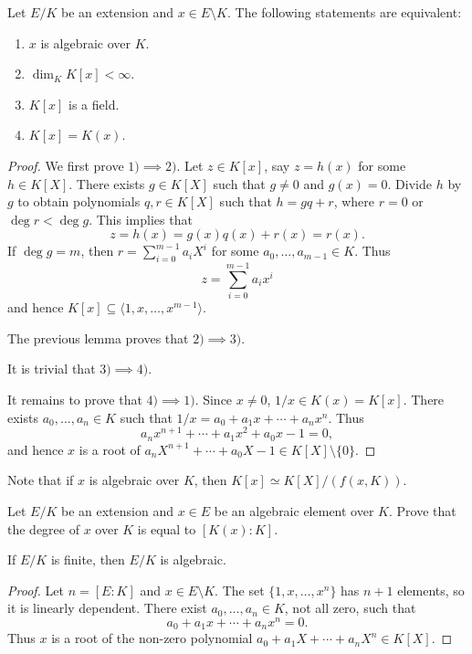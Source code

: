 \begin{theorem}
	Let $E/K$ be an extension and $x\in E\setminus K$.
	The following statements are equivalent:
	\begin{enumerate}
		\item $x$ is algebraic over $K$.
		\item $\dim_KK[x]<\infty$.
		\item $K[x]$ is a field.
		\item $K[x]=K(x)$. 
	\end{enumerate}
\end{theorem}

\begin{proof}
	We first prove $1)\implies 2)$. Let $z\in K[x]$, say $z=h(x)$ for some $h\in K[X]$. There exists
	$g\in K[X]$ such that $g\ne 0$ and $g(x)=0$. Divide $h$ by $g$ to obtain 
	polynomials $q,r\in K[X]$ such that $h=gq+r$, where $r=0$ or $\deg r<\deg g$. This implies that
	\[
		z=h(x)=g(x)q(x)+r(x)=r(x).
	\]
	If $\deg g=m$, then $r=\sum_{i=0}^{m-1}a_iX^i$ for some $a_0,\dots,a_{m-1}\in K$. Thus
	\[
 z=\sum_{i=0}^{m-1}a_ix^i 
 \]
 and hence $K[x]\subseteq\langle 1,x,\dots,x^{m-1}\rangle$. 

	The previous lemma proves that $2)\implies 3)$. 

	It is trivial that $3)\implies 4)$. 

	It remains to prove that $4)\implies 1)$. 
	Since $x\ne 0$, $1/x\in K(x)=K[x]$. There exists $a_0,\dots,a_n\in K$ such that
	$1/x=a_0+a_1x+\cdots+a_nx^n$. Thus
	\[
		a_nx^{n+1}+\cdots+a_1x^2+a_0x-1=0, 
	\]
	and hence $x$ is a root of $a_nX^{n+1}+\cdots+a_0X-1\in K[X]\setminus\{0\}$. 
\end{proof}

Note that if $x$ is algebraic over $K$, then
$K[x]\simeq K[X]/(f(x,K))$. 

\begin{exercise}
\label{xca:degree_of_x}
    Let $E/K$ be an extension and $x\in E$ be an algebraic element over $K$.
    Prove that the degree of $x$ over $K$ is equal to $[K(x):K]$. 
\end{exercise}

\begin{corollary}
\label{cor:finite=>algebraic}
	If $E/K$ is finite, then $E/K$ is algebraic. 
\end{corollary}

\begin{proof}
	Let $n=[E:K]$ and $x\in E\setminus K$. The set $\{1,x,\dots,x^n\}$ has $n+1$ elements, so it is linearly dependent. 
	There exist $a_0,\dots,a_n\in K$, not all zero, such that
	\[
        a_0+a_1x+\cdots+a_nx^n=0.
        \]
        Thus $x$ is a root of the non-zero
	polynomial $a_0+a_1X+\cdots+a_nX^n\in K[X]$. 
\end{proof}


